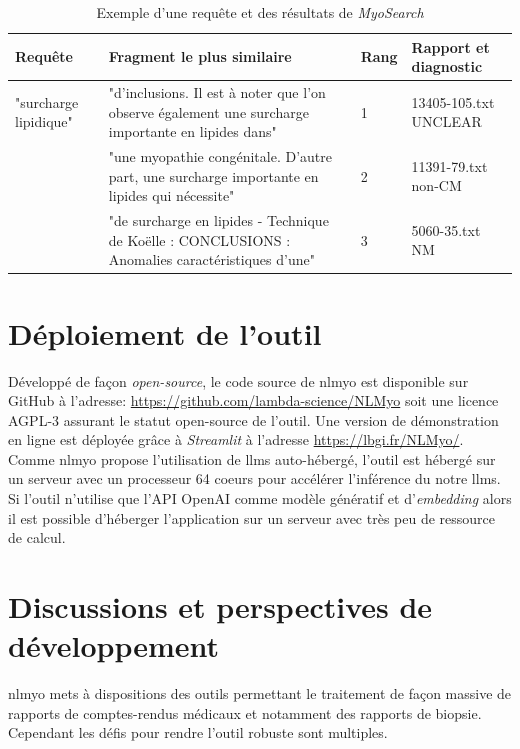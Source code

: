 \begin{table}[ht]
\centering
\caption{Exemple d'une requête et des résultats de \textit{MyoSearch}}
\label{tab:myosearch_results}
\begin{tabularx}{\textwidth}{|X|X|p{1cm}|p{2cm}|}
\toprule
\textbf{Requête} & \textbf{Fragment le plus similaire} & \textbf{Rang} & \textbf{Rapport et diagnostic} \\\hline
"surcharge lipidique" & "d’inclusions. Il est à noter que l’on observe également une surcharge importante en lipides dans" \newline & 1 & 13405-105.txt UNCLEAR \\
 & "une myopathie congénitale. D'autre part, une surcharge importante en lipides qui nécessite"\newline & 2 & 11391-79.txt non-CM \\
 & "de surcharge en lipides - Technique de Koëlle : CONCLUSIONS : Anomalies caractéristiques d’une" & 3 & 5060-35.txt NM \\ \hline
\end{tabularx}
\end{table}

\section{Déploiement de l'outil}
Développé de façon \textit{open-source}, le code source de \gls{nlmyo} est disponible sur GitHub à l'adresse: \href{https://github.com/lambda-science/NLMyo}{https://github.com/lambda-science/NLMyo} soit une licence AGPL-3 assurant le statut open-source de l'outil. Une version de démonstration en ligne est déployée grâce à \textit{Streamlit} à l'adresse \href{https://lbgi.fr/NLMyo/}{https://lbgi.fr/NLMyo/}. Comme \gls{nlmyo} propose l'utilisation de \gls{llms} auto-hébergé, l'outil est hébergé sur un serveur avec un processeur 64 coeurs pour accélérer l'inférence du notre \gls{llms}. Si l'outil n'utilise que l'API OpenAI comme modèle génératif et d'\textit{embedding} alors il est possible d'héberger l'application sur un serveur avec très peu de ressource de calcul.

\section{Discussions et perspectives de développement}
\gls{nlmyo} mets à dispositions des outils permettant le traitement de façon massive de rapports de comptes-rendus médicaux et notamment des rapports de biopsie. Cependant les défis pour rendre l'outil robuste sont multiples. 

